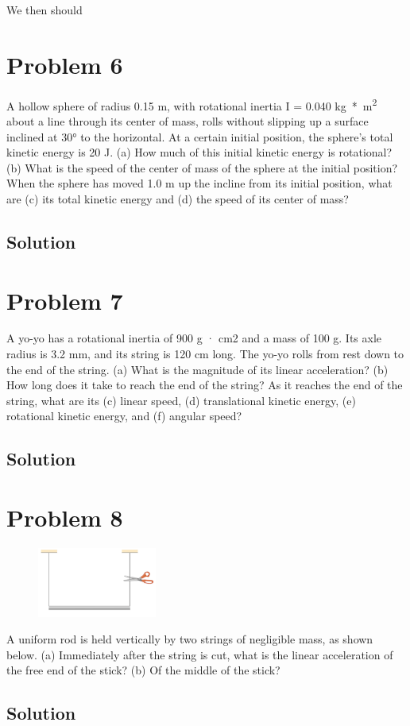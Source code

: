 \documentclass[12pt]{article}
\begin{document}
We then should 


\pagebreak
\section{Problem 6}
A hollow sphere of radius 0.15 m, with rotational inertia I = 0.040 \unit{\kilo\gram*\meter^2} about a line through its center of mass, rolls without slipping up a surface inclined at 30\unit{\degree} to the horizontal. At a certain initial position, the sphere's total kinetic energy is 20 J. (a) How much of this initial kinetic energy is rotational? (b) What is the speed of the center of mass of the sphere at the initial position? When the sphere has moved 1.0 m up the incline from its initial position, what are (c) its total kinetic energy and (d) the speed of its center of mass?

\subsection{Solution}


\pagebreak
\section{Problem 7}
A yo-yo has a rotational inertia of 900 g · cm2 and a mass of 100 g. Its axle radius is 3.2 mm, and its string is 120 cm long. The yo-yo rolls from rest down to the end of the string. (a) What is the magnitude of its linear acceleration? (b) How long does it take to reach the end of the string? As it reaches the end of the string, what are its (c) linear speed, (d) translational kinetic energy, (e) rotational kinetic energy, and (f) angular speed?

\subsection{Solution}


\pagebreak
\section{Problem 8}
\begin{figure}
    \vspace{-30pt}
    \includegraphics[width=0.35\textwidth]{graph_8.png} 
\end{figure}
A uniform rod is held vertically by two strings of negligible mass, as shown below. (a) Immediately after the string is cut, what is the linear acceleration of the free end of the stick? (b) Of the middle of the stick?

\subsection{Solution}
\end{document}
